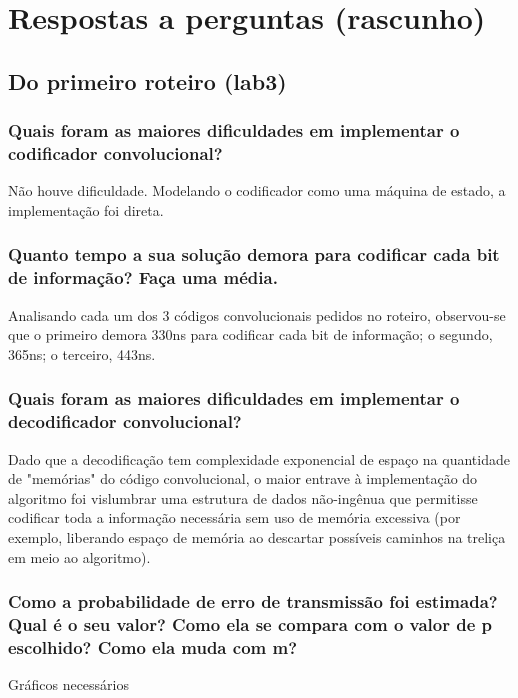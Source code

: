 \section{Respostas a perguntas (rascunho)}

\subsection{Do primeiro roteiro (lab3)}

\subsubsection{Quais foram as maiores dificuldades em implementar o codificador convolucional?}

Não houve dificuldade. Modelando o codificador como uma máquina de estado, a implementação foi direta.

\subsubsection{Quanto tempo a sua solução demora para codificar cada bit de informação? Faça uma média.}

Analisando cada um dos 3 códigos convolucionais pedidos no roteiro, observou-se que o primeiro demora 330ns para codificar cada bit de informação; o segundo, 365ns; o terceiro, 443ns.

\subsubsection{Quais foram as maiores dificuldades em implementar o decodificador convolucional?}

Dado que a decodificação tem complexidade exponencial de espaço na quantidade de "memórias" do código convolucional, o maior entrave à implementação do algoritmo foi vislumbrar uma estrutura de dados não-ingênua que permitisse codificar toda a informação necessária sem uso de memória excessiva (por exemplo, liberando espaço de memória ao descartar possíveis caminhos na treliça em meio ao algoritmo).

\subsubsection{Como a probabilidade de erro de transmissão foi estimada? Qual é o seu valor? Como ela se
compara com o valor de p escolhido? Como ela muda com m?}

Gráficos necessários

